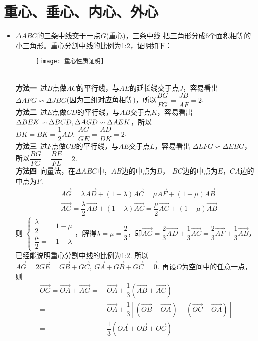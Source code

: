 \section{重心、垂心、内心、外心}
\begin{itemize}[leftmargin=\inteval{\myitemleftmargin}pt,itemsep=
   \inteval{\myitemitempsep}pt,topsep=\inteval{\myitemtopsep}pt]
\item $ \Delta ABC $的三条中线交于一点$ G $(重心)，三条中线
把三角形分成6个面积相等的小三角形。重心分割中线的比例为1:2，证明如下：
\begin{figure}[h]
    \centering
    \texttt{[image: 重心性质证明]}
\end{figure} \\
\textbf{方法一}\ 过$ B $点做$ AC $的平行线，与$ AE $的延长线交于点$ J $，容易看出
$ \Delta AFG \backsim \Delta JBG $(因为三组对应角相等)，所以$ \dfrac{BG}{FG}=
\dfrac{JB}{AF}=2 $. \\
\textbf{方法二}\ 过$ E $点做$ CD $的平行线，与$ AB $交于点$ K $，容易看出
$ \Delta BEK \backsim \Delta BCD,\\ \Delta AGD \backsim \Delta AEK $，所以
$ DK=BK=\dfrac{1}{2}AD,\ \dfrac{AG}{GE}=\dfrac{AD}{DK}=2 $. \\
\textbf{方法三}\ 过$ F $点做$ CB $的平行线，与$ AE $交于点$ L $，容易看出
$ \Delta LFG \backsim \Delta EBG $，所以$\dfrac{BG}{FG}=\dfrac{BE}{FL}=2 $. \\
\textbf{方法四}\ 向量法，在$ \Delta ABC $中，$ AB $边的中点为$ D $，
$ BC $边的中点为$ E $，$ CA $边的中点为$ F $. 
\begin{align*}
    & \vec{AG}=\lambda \vec{AD}+(1-\lambda)\vec{AC}=
    \mu \vec{AF}+(1-\mu)\vec{AB} \\
    & \vec{AG}=\dfrac{\lambda}{2} \vec{AB}+(1-\lambda)\vec{AC}=
    \dfrac{\mu}{2} \vec{AC}+(1-\mu)\vec{AB} 
\end{align*}
则 $ \left\{ 
\begin{aligned}
    \dfrac{\lambda}{2} =&\ 1-\mu  \\
    \dfrac{\mu}{2} =&\ 1-\lambda
\end{aligned}
\right. $，解得$ \lambda=\mu=\dfrac{2}{3} $，即$ \vec{AG}=
\dfrac{2}{3}\vec{AD}+\dfrac{1}{3}\vec{AC}=
\dfrac{2}{3}\vec{AF}+\dfrac{1}{3}\vec{AB} $，
已经能说明重心分割中线的比例为1:2. 所以$ \vec{AG}=
2\vec{GE}=\vec{GB}+\vec{GC}, 
\ \vec{GA}+\vec{GB}+\vec{GC}=
\vec{0} $. 再设$ O $为空间中的任意一点，则
\begin{align*}
    \vec{OG}=\vec{OA}+\vec{AG} =&\ 
    \vec{OA}+\dfrac{1}{3}\left(\vec{AB}+
    \vec{AC} \right) \\
    =&\ \vec{OA}+\dfrac{1}{3} \left[\left( \vec{OB} 
    -\vec{OA}\right) + \left( \vec{OC} -\vec{OA}\right)\right]  \\
    =&\ \dfrac{1}{3}\left(\vec{OA}+\vec{OB}+
    \vec{OC} \right) 
\end{align*}


\end{itemize}
